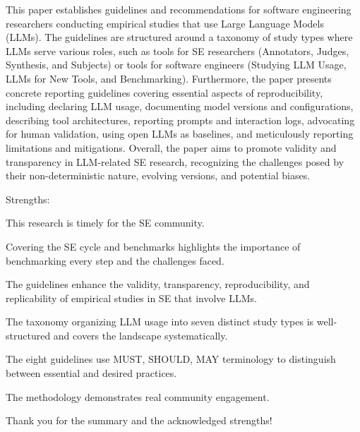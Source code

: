 \documentclass[12pt,english]{reviewresponse}
\begin{document}
\reviewer
\begin{generalcomment}
This paper establishes guidelines and recommendations for software engineering researchers conducting empirical studies that use Large Language Models (LLMs). The guidelines are structured around a taxonomy of study types where LLMs serve various roles, such as tools for SE researchers (Annotators, Judges, Synthesis, and Subjects) or tools for software engineers (Studying LLM Usage, LLMs for New Tools, and Benchmarking). Furthermore, the paper presents concrete reporting guidelines covering essential aspects of reproducibility, including declaring LLM usage, documenting model versions and configurations, describing tool architectures, reporting prompts and interaction logs, advocating for human validation, using open LLMs as baselines, and meticulously reporting limitations and mitigations. Overall, the paper aims to promote validity and transparency in LLM-related SE research, recognizing the challenges posed by their non-deterministic nature, evolving versions, and
potential biases.

Strengths:

This research is timely for the SE community.

Covering the SE cycle and benchmarks highlights the importance of benchmarking every step and the challenges faced.

The guidelines enhance the validity, transparency, reproducibility, and replicability of empirical studies in SE that involve LLMs.

The taxonomy organizing LLM usage into seven distinct study types is well-structured and covers the landscape systematically.

The eight guidelines use MUST, SHOULD, MAY terminology to distinguish between essential and desired practices.

The methodology demonstrates real community engagement.
\end{generalcomment}
\begin{revresponse}
    Thank you for the summary and the acknowledged strengths!
\end{revresponse}
\end{document}

